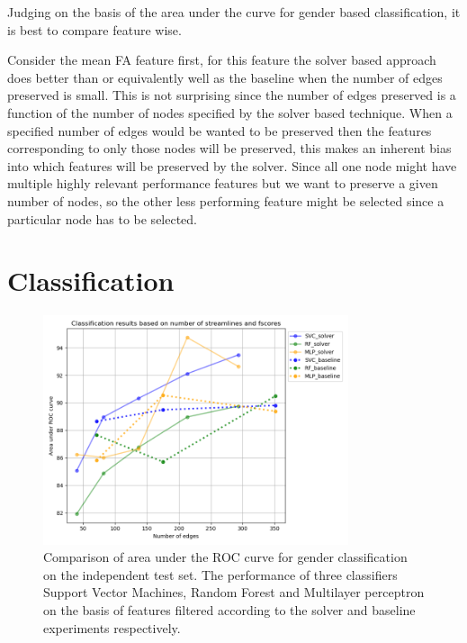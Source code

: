 \documentclass[msthesis.tex]{subfiles}
\begin{document}
Judging on the basis of the area under the curve for gender based classification, it is best to compare feature wise.

Consider the mean FA feature first, for this feature the solver based approach does better than or equivalently well as the baseline when the number of edges preserved is small. This is not surprising since the number of edges preserved is a function of the number of nodes specified by the solver based technique. When a specified number of edges would be wanted to be preserved then the features corresponding to only those nodes will be preserved, this makes an inherent bias into which features will be preserved by the solver. Since all one node might have multiple highly relevant performance features but we want to preserve a given number of nodes, so the other less performing feature might be selected since a particular node has to be selected.



\section{Classification}

\begin{figure}
    \centering
    \includegraphics[width=0.8\textwidth]{images/select_clf_auc_gender.png}
    \caption{Comparison of area under the ROC curve for gender classification on the independent test set. The performance of three classifiers Support Vector Machines, Random Forest and Multilayer perceptron on the basis of features filtered according to the solver and baseline experiments respectively.}
    \label{fig:clf_solver results}
\end{figure}
\end{document}
